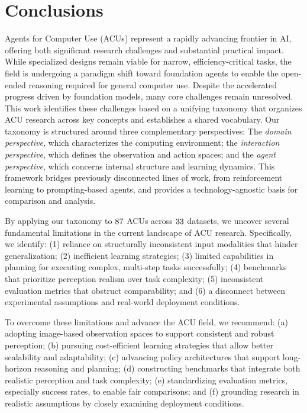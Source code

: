 %
\section{Conclusions}\label{sec:discussion_conclusion}
Agents for Computer Use (ACUs) represent a rapidly advancing frontier in AI, offering both significant research challenges and substantial practical impact.
While specialized designs remain viable for narrow, efficiency-critical tasks, the field is undergoing a paradigm shift toward foundation agents to enable the open-ended reasoning required for general computer use.
Despite the accelerated progress driven by foundation models, many core challenges remain unresolved.
This work identifies these challenges based on a unifying taxonomy that organizes ACU research across key concepts and establishes a shared vocabulary. Our taxonomy is structured around three complementary perspectives: The \emph{domain perspective}, which characterizes the computing environment; the \emph{interaction perspective}, which defines the observation and action spaces; and the \emph{agent perspective}, which concerns internal structure and learning dynamics. This framework bridges previously disconnected lines of work, from reinforcement learning to prompting-based agents, and provides a technology-agnostic basis for comparison and analysis.

By applying our taxonomy to $87$ ACUs across $33$ datasets, we uncover several fundamental limitations in the current landscape of ACU research. Specifically, we identify:
(1) reliance on structurally inconsistent input modalities that hinder generalization; %
(2) inefficient learning strategies; %
(3) limited capabilities in planning for executing complex, multi-step tasks successfully; %
(4) benchmarks that prioritize perception realism over task complexity; %
(5) inconsistent evaluation metrics that obstruct comparability; and %
(6) a disconnect between experimental assumptions and real-world deployment conditions. %

To overcome these limitations and advance the ACU field, we recommend:
(a) adopting image-based observation spaces to support consistent and robust perception;
(b) pursuing cost-efficient learning strategies that allow better scalability and adaptability;
(c) advancing policy architectures that support long-horizon reasoning and planning;
(d) constructing benchmarks that integrate both realistic perception and task complexity;
(e) standardizing evaluation metrics, especially success rates, to enable fair comparisons; and
(f) grounding research in realistic assumptions by closely examining deployment conditions.

